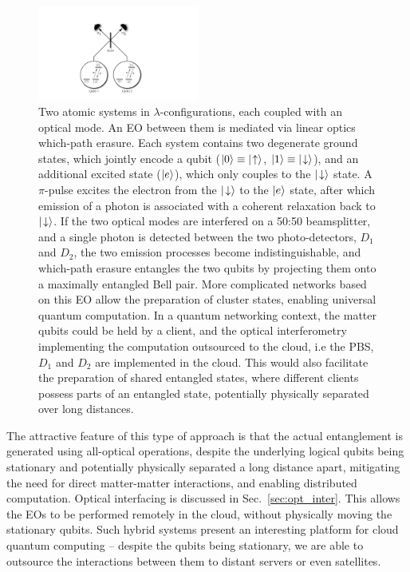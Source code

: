\begin{figure}[!htbp]
\includegraphics[clip=true, width=0.475\textwidth]{barrett_kok}
\captionspacefig \caption{Two atomic systems in $\lambda$-configurations, each coupled with an optical mode. An EO between them is mediated via linear optics which-path erasure. Each system contains two degenerate ground states, which jointly encode a qubit (\mbox{$|0\rangle\equiv|\!\uparrow\rangle$}, \mbox{$|1\rangle\equiv|\!\downarrow\rangle$}), and an additional excited state ($|e\rangle$), which only couples to the $|\!\downarrow\rangle$ state. A $\pi$-pulse excites the electron from the $|\!\downarrow\rangle$ to the $|e\rangle$ state, after which emission of a photon is associated with a coherent relaxation back to $|\!\downarrow\rangle$. If the two optical modes are interfered on a 50:50 beamsplitter, and a single photon is detected between the two photo-detectors, $D_1$ and $D_2$, the two emission processes become indistinguishable, and which-path erasure entangles the two qubits by projecting them onto a maximally entangled Bell pair. More complicated networks based on this EO allow the preparation of cluster states, enabling universal quantum computation. In a quantum networking context, the matter qubits could be held by a client, and the optical interferometry implementing the computation outsourced to the cloud, i.e the PBS, $D_1$ and $D_2$ are implemented in the cloud. This would also facilitate the preparation of shared entangled states, where different clients possess parts of an entangled state, potentially physically separated over long distances.} \label{fig:barrett_kok}
\end{figure}

The attractive feature of this type of approach is that the actual entanglement is generated using all-optical operations, despite the underlying logical qubits being stationary and potentially physically separated a long distance apart, mitigating the need for direct matter-matter interactions, and enabling distributed computation. Optical interfacing is discussed in Sec.~\ref{sec:opt_inter}. This allows the EOs to be performed remotely in the cloud, without physically moving the stationary qubits. Such hybrid systems present an interesting platform for cloud quantum computing -- despite the qubits being stationary, we are able to outsource the interactions between them to distant servers or even satellites.

